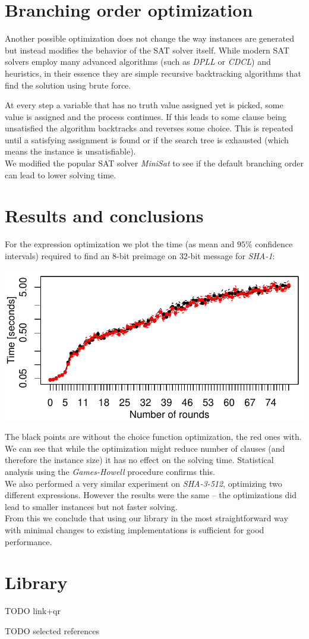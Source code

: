 \documentclass[myposter,portrait]{sciposter}
\def\mysection#1{
{\color{sectionCol}\section*{\sc\bfseries #1}}}
\begin{document}
\begin{multicols*}{3}
\mysection{Branching order optimization}
Another possible optimization does not change the way instances are generated but instead modifies the behavior of the SAT solver itself.
While modern SAT solvers employ many advanced algorithms (such as \emph{DPLL} or \emph{CDCL}) and heuristics, in their essence they are simple recursive backtracking algorithms that find the solution using brute force.

At every step a variable that has no truth value assigned yet is picked, some value is assigned and the process continues.
If this leads to some clause being unsatisfied the algorithm backtracks and reverses some choice.
This is repeated until a satisfying assignment is found or if the search tree is exhausted (which means the instance is unsatisfiable).
~\\

We modified the popular SAT solver \emph{MiniSat} to see if the default branching order can lead to lower solving time.

\columnbreak
\mysection{Results and conclusions}
For the expression optimization we plot the time (as mean and $95\%$ confidence intervals) required to find an $8$-bit preimage on $32$-bit message for \emph{SHA-1}:

\includegraphics[width=\columnwidth]{figures/opt-sha1/sha1-32bit-8bitref-cmp-espresso-sq.pdf}

The black points are without the choice function optimization, the red ones with.
We can see that while the optimization might reduce number of clauses (and therefore the instance size) it has no effect on the solving time.
Statistical analysis using the \emph{Games-Howell} procedure confirms this.
~\\

We also performed a very similar experiment on \emph{SHA-3-512}, optimizing two different expressions.
However the results were the same -- the optimizations did lead to smaller instances but not faster solving.
~\\

From this we conclude that using our library in the most straightforward way with minimal changes to existing implementations is sufficient for good performance.


\mysection{Library}
TODO link+qr

TODO selected references





\end{multicols*}
\end{document}
